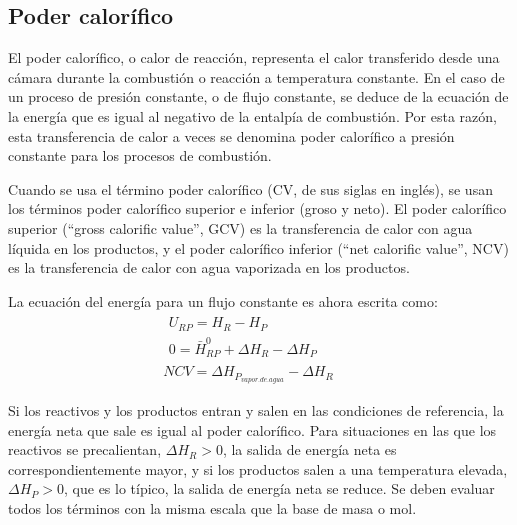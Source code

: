 \subsection{Poder calorífico}
\par El poder calorífico, o calor de reacción, representa el calor transferido desde una cámara durante la combustión o reacción a temperatura constante. En el caso de un proceso de presión constante, o de flujo constante, se deduce de la ecuación de la energía que es igual al negativo de la entalpía de combustión. Por esta razón, esta transferencia de calor a veces se denomina poder calorífico a presión constante para los procesos de combustión.
\par Cuando se usa el término poder calorífico (CV, de sus siglas en inglés), se usan los términos poder calorífico superior e inferior (groso y neto). El poder calorífico superior (``gross calorific value'', GCV) es la transferencia de calor con agua líquida en los productos, y el poder calorífico inferior (``net calorific value'', NCV) es la transferencia de calor con agua vaporizada en los productos.
\par La ecuación del energía para un flujo constante es ahora escrita como:
\begin{gather}
\label{eq:cv}
\begin{gathered}
U_{RP} = H_R - H_P \quad\quad\quad\quad\quad\quad\\
0 = \bar H^0_{RP} + \Delta H_R - \Delta H_P
\end{gathered}\\
 NCV = \Delta H_{P_{vapor.de.agua}} - \Delta H_R \quad
\end{gather}
\par Si los reactivos y los productos entran y salen en las condiciones de referencia, la energía neta que sale es igual al poder calorífico. Para situaciones en las que los reactivos se precalientan, $\Delta H_R > 0$, la salida de energía neta es correspondientemente mayor, y si los productos salen a una temperatura elevada, $\Delta H_P > 0$, que es lo típico, la salida de energía neta se reduce. Se deben evaluar todos los términos con la misma escala que la base de masa o mol.

